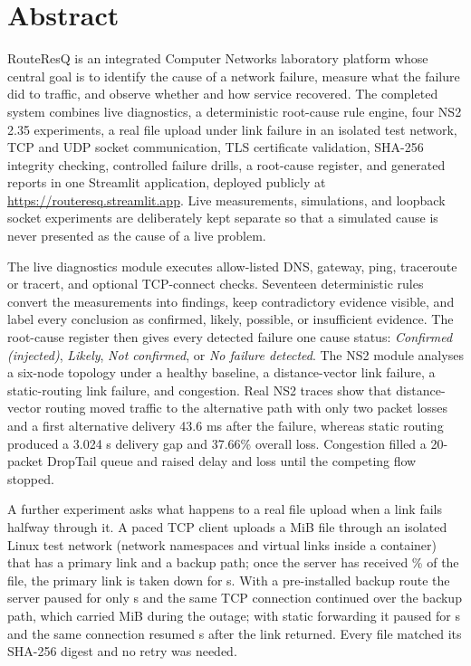 \documentclass[12pt,a4paper]{report}
\numberwithin{equation}{chapter}
\begin{document}
\setcounter{page}{1}

\chapter*{Abstract}
RouteResQ is an integrated Computer Networks laboratory platform whose central goal is to identify the cause of a network failure, measure what the failure did to traffic, and observe whether and how service recovered. The completed system combines live diagnostics, a deterministic root-cause rule engine, four NS2 2.35 experiments, a real file upload under link failure in an isolated test network, TCP and UDP socket communication, TLS certificate validation, SHA-256 integrity checking, controlled failure drills, a root-cause register, and generated reports in one Streamlit application, deployed publicly at \url{https://routeresq.streamlit.app}. Live measurements, simulations, and loopback socket experiments are deliberately kept separate so that a simulated cause is never presented as the cause of a live problem.

The live diagnostics module executes allow-listed DNS, gateway, ping, traceroute or tracert, and optional TCP-connect checks. Seventeen deterministic rules convert the measurements into findings, keep contradictory evidence visible, and label every conclusion as confirmed, likely, possible, or insufficient evidence. The root-cause register then gives every detected failure one cause status: \emph{Confirmed (injected)}, \emph{Likely}, \emph{Not confirmed}, or \emph{No failure detected}. The NS2 module analyses a six-node topology under a healthy baseline, a distance-vector link failure, a static-routing link failure, and congestion. Real NS2 traces show that distance-vector routing moved traffic to the alternative path with only two packet losses and a first alternative delivery 43.6 ms after the failure, whereas static routing produced a 3.024 s delivery gap and 37.66\% overall loss. Congestion filled a 20-packet DropTail queue and raised delay and loss until the competing flow stopped.

A further experiment asks what happens to a real file upload when a link fails halfway through it. A paced TCP client uploads a \upFileMiB{} MiB file through an isolated Linux test network (network namespaces and virtual links inside a container) that has a primary link and a backup path; once the server has received \upFaultPct\% of the file, the primary link is taken down for \upOutage{} s. With a pre-installed backup route the server paused for only \upFailStall{} s and the same TCP connection continued over the backup path, which carried \upFailBackupMiB{} MiB during the outage; with static forwarding it paused for \upStatStall{} s and the same connection resumed \upStatResume{} s after the link returned. Every file matched its SHA-256 digest and no retry was needed.
\end{document}
